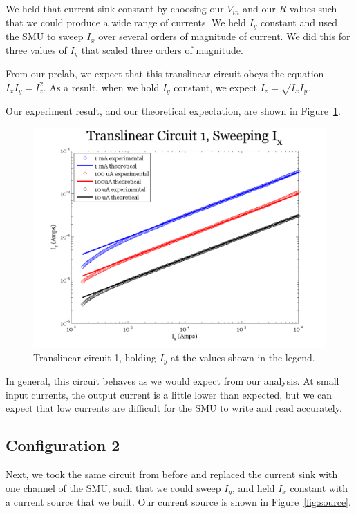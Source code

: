 \documentclass{article}
\begin{document}
We held that current sink constant by choosing our $V_{in}$ and our $R$ values such that we could produce a wide range of currents.  We held $I_y$ constant and used the SMU to sweep $I_x$ over several orders of magnitude of current.   We did this for three values of $I_y$ that scaled three orders of magnitude.

From our prelab, we expect that this translinear circuit obeys the equation $I_x I_y = I_z ^2$.  As a result, when we hold $I_y$ constant, we expect $I_z = \sqrt{I_xI_y}$.  

Our experiment result, and our theoretical expectation, are shown in Figure~\ref{fig:exp2sweepx}.

\begin{figure}[H]
\begin{center}
\includegraphics[scale=.75]{exp2_sweepx.png}
\caption{Translinear circuit 1, holding $I_y$ at the values shown in the legend.}
\label{fig:exp2sweepx}
\end{center}
\end{figure}

In general, this circuit behaves as we would expect from our analysis.  At small input currents, the output current is a little lower than expected, but we can expect that low currents are difficult for the SMU to write and read accurately.

\subsection*{Configuration 2}

Next, we took the same circuit from before and replaced the current sink with one channel of the SMU, such that we could sweep $I_y$, and held $I_x$ constant with a current source that we built.  Our current source is shown in Figure~\ref{fig:source}.
\end{document}
